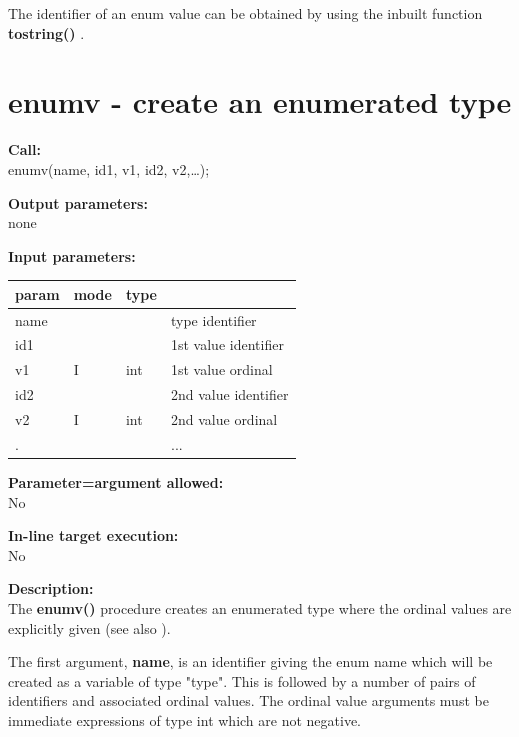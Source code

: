         The identifier of an enum value can be obtained by using
        the inbuilt function {\bf tostring()} .


    \section{enumv - create an enumerated type}\label{sec:ipenumv}
        
        {\bf Call:} \\
        enumv(name, id1, v1, id2, v2,\dots);
        
        {\bf Output parameters:} \\
        none
        
        {\bf Input parameters:} \\
        \begin{tabular}{| l | l | l | l |}
        \hline
        param  & mode     & type  & \\
        \hline \hline
        name &   &     & type identifier        \\ \hline
        id1  &   &     & 1st value identifier   \\ \hline
        v1   & I & int & 1st value ordinal      \\ \hline
        id2  &   &     & 2nd value identifier   \\ \hline
        v2   & I & int & 2nd value ordinal      \\ \hline
         .   &   &     & ...                    \\ \hline
        \end{tabular}
        
        {\bf Parameter=argument allowed:} \\
        No
        
        {\bf In-line target execution:} \\
        No
        
        {\bf Description:} \\
        The {\bf enumv()} procedure creates an enumerated type where
        the ordinal values are explicitly given (see also ).
               
        The first argument, {\bf name}, 
        is an identifier giving the enum name which will be created
        as a variable of type "type". This is followed by a number of
        pairs of identifiers and associated ordinal values. The ordinal
        value arguments must be immediate expressions of type int which
        are not negative.


